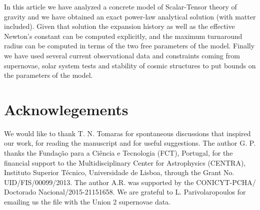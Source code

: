 In this article we have analyzed a concrete model of Scalar-Tensor theory of gravity and we have obtained an exact power-law analytical solution (with matter included). Given that solution the expansion history as well as the effective Newton's constant can be computed explicitly, and the maximum turnaround radius can be computed in terms of the two free parameters of the model. Finally we have used several current observational data and constraints coming from supernovae, solar system tests and stability of cosmic structures to put bounds on the parameters of the model.

\section*{Acknowlegements}

We would like to thank T. N. Tomaras for spontaneous discussions that inspired our work, for reading the manuscript and for useful suggestions.
The author G. P. thanks the Funda\c c\~ao para a Ci\^encia e Tecnologia (FCT), Portugal, for the financial support to the Multidisciplinary 
Center for Astrophysics (CENTRA),  Instituto Superior T\'ecnico,  Universidade de Lisboa,  through the Grant No. UID/FIS/00099/2013. The author A.R. was supported by the CONICYT-PCHA/\- Doctorado Nacional/2015-21151658. 
We are grateful to L. Parivola\-ropoulos for emailing us the file with the Union 2 supernovae data.


